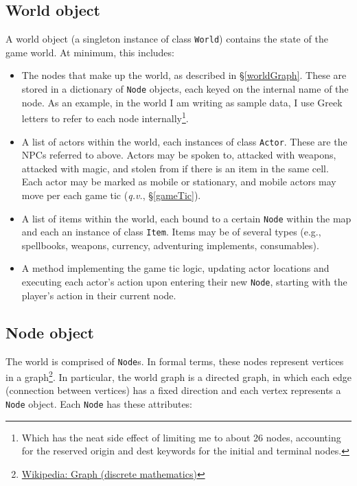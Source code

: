 \documentclass[11pt,letterpaper]{article}
\begin{document}
\subsection{World object}

A world object (a singleton instance of class {\tt World}) contains the state of the game world.  At minimum, this includes:

\begin{itemize}
    \item The nodes that make up the world, as described in \S\ref{worldGraph}.  These are stored in a dictionary of {\tt Node} objects, each keyed on the internal name of the node.  As an example, in the world I am writing as sample data, I use Greek letters to refer to each node internally\footnote{Which has the neat side effect of limiting me to about 26 nodes, accounting for the reserved {\sc origin} and {\sc dest} keywords for the initial and terminal nodes.}.
    \item A list of actors within the world, each instances of class {\tt Actor}.  These are the NPCs referred to above.  Actors may be spoken to, attacked with weapons, attacked with magic, and stolen from if there is an item in the same cell.  Each actor may be marked as mobile or stationary, and mobile actors may move per each game tic ({\it q.v.}, \S\ref{gameTic}).
    \item A list of items within the world, each bound to a certain {\tt Node} within the map and each an instance of class {\tt Item}.  Items may be of several types (e.g., spellbooks, weapons, currency, adventuring implements, consumables).
    \item A method implementing the game tic logic, updating actor locations and executing each actor's action upon entering their new {\tt Node}, starting with the player's action in their current node.
\end{itemize}

\subsection{Node object}

The world is comprised of {\tt Node}s.  In formal terms, these nodes represent vertices in a graph\footnote{\href{https://en.wikipedia.org/wiki/Graph_(discrete_mathematics)}{Wikipedia: Graph (discrete mathematics)}}.  In particular, the world graph is a directed graph, in which each edge (connection between vertices) has a fixed direction and each vertex represents a {\tt Node} object.  Each {\tt Node} has these attributes:
\end{document}
